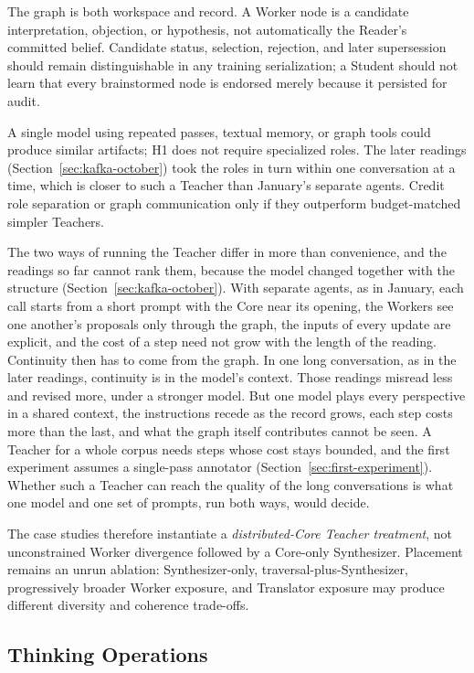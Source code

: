 \documentclass[11pt]{article}
\begin{document}
The graph is both workspace and record. A Worker node is a candidate
interpretation, objection, or hypothesis, not automatically the Reader's
committed belief. Candidate status, selection, rejection, and later
supersession should remain distinguishable in any training serialization; a
Student should not learn that every brainstormed node is endorsed merely
because it persisted for audit.

A single model using repeated passes, textual memory, or graph tools could
produce similar artifacts; H1 does not require specialized roles. The later readings (Section~\ref{sec:kafka-october}) took the roles in turn within one conversation at a time, which is closer to such a Teacher than January's separate agents. Credit role
separation or graph communication only if they outperform budget-matched
simpler Teachers.

The two ways of running the Teacher differ in more than convenience, and the
readings so far cannot rank them, because the model changed together with the
structure (Section~\ref{sec:kafka-october}). With separate agents, as in
January, each call starts from a short prompt with the Core near its opening,
the Workers see one another's proposals only through the graph, the inputs of
every update are explicit, and the cost of a step need not grow with the length
of the reading. Continuity then has to come from the graph. In one long
conversation, as in the later readings, continuity is in the model's context.
Those readings misread less and revised more, under a stronger model. But one
model plays every perspective in a shared context, the instructions recede as
the record grows, each step costs more than the last, and what the graph itself
contributes cannot be seen. A Teacher for a whole corpus needs steps whose cost
stays bounded, and the first experiment assumes a single-pass annotator
(Section~\ref{sec:first-experiment}). Whether such a Teacher can reach the
quality of the long conversations is what one model and one set of prompts, run
both ways, would decide.

The case studies therefore instantiate a \emph{distributed-Core Teacher
treatment}, not unconstrained Worker divergence followed by a Core-only
Synthesizer. Placement remains an unrun ablation: Synthesizer-only,
traversal-plus-Synthesizer, progressively broader Worker exposure, and Translator
exposure may produce different diversity and coherence trade-offs.

\subsection{Thinking Operations}\label{sec:thinking-operations}
\end{document}
